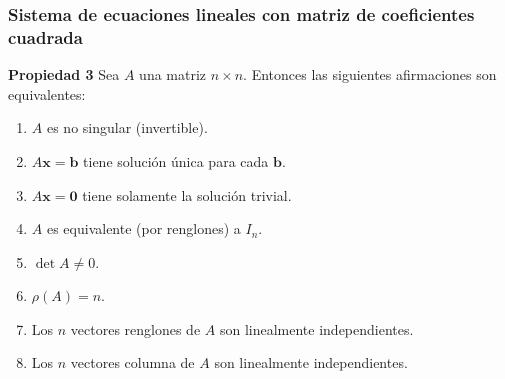 \begin{frame}\frametitle{Sistema de ecuaciones lineales con matriz de coeficientes cuadrada}

\begin{prop}{\textbf{Propiedad 3}}
	Sea $A$ una matriz $n\times n$. Entonces las siguientes afirmaciones son equivalentes:
	\begin{enumerate}[$a$]
		\item $A$ es no singular (invertible).
		\item $A\mathbf{x}=\mathbf{b}$ tiene solución única para cada $\mathbf{b}$.
		\item $A\mathbf{x}=\mathbf{0}$ tiene solamente la solución trivial.
		\item $A$ es equivalente (por renglones) a $I_n$.
		\item $\det A \neq 0$.
		\item $\rho(A) = n$.
		\item Los $n$ vectores renglones de $A$ son linealmente independientes.
		\item Los $n$ vectores columna de $A$ son linealmente independientes.
	\end{enumerate}
\end{prop}	

\end{frame}